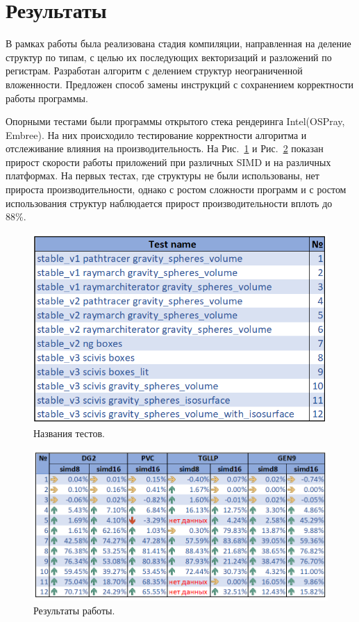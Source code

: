 \section{Результаты}
\label{sec:conclusion-future}
В рамках работы была реализована стадия компиляции, направленная на деление структур по типам, с целью их последующих векторизаций и разложений по регистрам. Разработан алгоритм с делением структур неограниченной вложенности. Предложен способ замены инструкций с сохранением корректности работы программы.

Опорными тестами были программы открытого стека рендеринга Intel(OSPray, Embree). На них происходило тестирование корректности алгоритма и отслеживание влияния на производительность. На Рис.~\ref{fig:results_name} и Рис.~\ref{fig:results_pure} показан прирост скорости работы приложений при различных SIMD и на различных платформах. На первых тестах, где структуры не были использованы, нет прироста производительности, однако с ростом сложности программ и с ростом использования структур наблюдается прирост производительности вплоть до 88\%.

\begin{figure}[h]
    \centering
    \includegraphics[scale=0.55]{Images/results_name.png}
    \caption{Названия тестов.}
    \label{fig:results_name}
\end{figure}

\begin{figure}[h]
    \centering
    \includegraphics[scale=0.54]{Images/results_pure.png}
    \caption{Результаты работы.}
    \label{fig:results_pure}
\end{figure}

